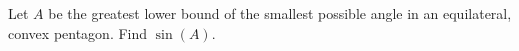 Let $A$ be the greatest lower bound of the smallest possible angle in an equilateral, convex pentagon. Find $\sin (A)$.
